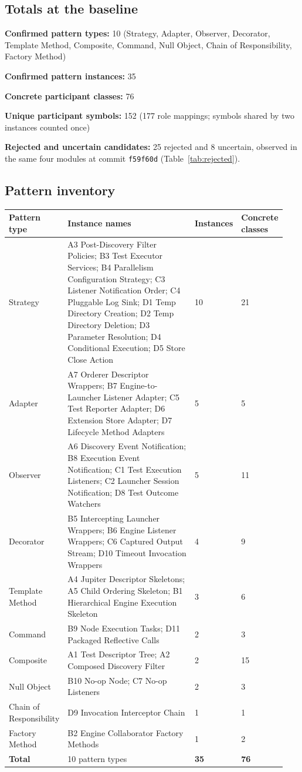 \documentclass[11pt,a4paper]{article}
\newcommand{\entry}[1]{\textbf{#1:} }
\begin{document}
\subsection{Totals at the baseline}
\entry{Confirmed pattern types}10 (Strategy, Adapter, Observer, Decorator, Template Method, Composite, Command, Null Object, Chain of Responsibility, Factory Method)\par
\entry{Confirmed pattern instances}35\par
\entry{Concrete participant classes}76\par
\entry{Unique participant symbols}152 (177 role mappings; symbols shared by two instances counted once)\par
\entry{Rejected and uncertain candidates}25 rejected and 8 uncertain, observed in the same four modules at commit \texttt{f59f60d} (Table~\ref{tab:rejected}).

\subsection{Pattern inventory}
\begin{longtable}{@{}p{0.17\linewidth}p{0.57\linewidth}p{0.09\linewidth}p{0.11\linewidth}@{}}\toprule
Pattern type & Instance names & Instances & Concrete classes\\\midrule\endhead
Strategy & A3 Post-Discovery Filter Policies; B3 Test Executor Services; B4 Parallelism Configuration Strategy; C3 Listener Notification Order; C4 Pluggable Log Sink; D1 Temp Directory Creation; D2 Temp Directory Deletion; D3 Parameter Resolution; D4 Conditional Execution; D5 Store Close Action & 10 & 21\\
Adapter & A7 Orderer Descriptor Wrappers; B7 Engine-to-Launcher Listener Adapter; C5 Test Reporter Adapter; D6 Extension Store Adapter; D7 Lifecycle Method Adapters & 5 & 5\\
Observer & A6 Discovery Event Notification; B8 Execution Event Notification; C1 Test Execution Listeners; C2 Launcher Session Notification; D8 Test Outcome Watchers & 5 & 11\\
Decorator & B5 Intercepting Launcher Wrappers; B6 Engine Listener Wrappers; C6 Captured Output Stream; D10 Timeout Invocation Wrappers & 4 & 9\\
Template Method & A4 Jupiter Descriptor Skeletons; A5 Child Ordering Skeleton; B1 Hierarchical Engine Execution Skeleton & 3 & 6\\
Command & B9 Node Execution Tasks; D11 Packaged Reflective Calls & 2 & 3\\
Composite & A1 Test Descriptor Tree; A2 Composed Discovery Filter & 2 & 15\\
Null Object & B10 No-op Node; C7 No-op Listeners & 2 & 3\\
Chain of Responsibility & D9 Invocation Interceptor Chain & 1 & 1\\
Factory Method & B2 Engine Collaborator Factory Methods & 1 & 2\\
\midrule\textbf{Total} & 10 pattern types & \textbf{35} & \textbf{76}\\
\bottomrule\end{longtable}
\end{document}
